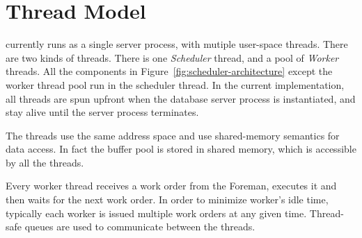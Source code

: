 %

\section{Thread Model}\label{apx:thread}
\sys{} currently runs as a single server process, with mutiple user-space threads. 
There are two kinds of threads. 
There is one \textit{Scheduler} thread, and a pool of \textit{Worker} threads. 
All the components in 
Figure~\ref{fig:scheduler-architecture} except the worker thread pool run in the 
scheduler thread. 
In the current implementation, all threads are spun upfront when the database server 
process is instantiated, and stay alive until the server process terminates.

The threads use the same address space and use shared-memory semantics for data 
access. 
In fact the buffer pool is stored in shared memory, which is accessible by all the threads. 

Every worker thread receives a work order from the Foreman, executes it and then waits for 
the next work order.
In order to minimize worker's idle time, typically each worker is issued multiple work 
orders at any given time. 
Thread-safe queues are used to communicate between the threads.

